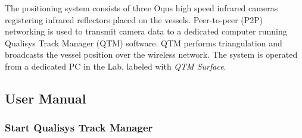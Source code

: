 \documentclass[a4paper,english]{report}
\begin{document}
The positioning system consists of three Oqus high speed infrared cameras registering infrared reflectors placed on the vessels. Peer-to-peer (P2P) networking is used to transmit camera data to a dedicated computer running Qualisys Track Manager (QTM) software. QTM performs triangulation and broadcasts the vessel position over the wireless network. The system is operated from a dedicated PC in the Lab, labeled with \textit{QTM Surface}. 

\subsection{User Manual}
\subsubsection*{Start Qualisys Track Manager}
\end{document}
